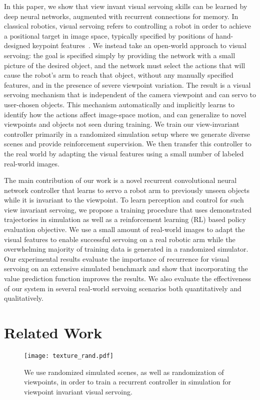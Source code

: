 \documentclass[10pt,twocolumn,letterpaper]{article}
\begin{document}
In this paper, we show that view invant visual servoing skills can be learned by deep neural networks, augmented with recurrent connections for memory. In classical robotics, visual servoing refers to controlling a robot in order to achieve a positional target in image space, typically specified by positions of hand-designed keypoint features~\cite{wilson1996relative,hutchinson1996tutorial}. We instead take an open-world approach to visual servoing: the goal is specified simply by providing the network with a small picture of the desired object, and the network must select the actions that will cause the robot's arm to reach that object, without any manually specified features, and in the presence of severe viewpoint variation. The result is a visual servoing mechanism that is independent of the camera viewpoint and can servo to user-chosen objects. This mechanism automatically and implicitly learns to identify how the actions affect image-space motion, and can generalize to novel viewpoints and objects not seen during training. We train our view-invariant controller primarily in a randomized simulation setup where we generate diverse scenes and provide reinforcement supervision. We then transfer this controller to the real world by adapting the visual features using a small number of labeled real-world images.

The main contribution of our work is a novel recurrent convolutional neural network controller that learns to servo a robot arm to previously unseen objects while it is invariant to the viewpoint. To learn perception and control for such view invariant servoing, we propose a training procedure that uses demonstrated trajectories in simulation as well as a reinforcement learning (RL) based policy evaluation objective. We use a small amount of real-world images to adapt the visual features to enable successful servoing on a real robotic arm while the overwhelming majority of training data is generated in a randomized simulator. Our experimental results evaluate the importance of recurrence for visual servoing on an extensive simulated benchmark and show that incorporating the value prediction function improves the results. We also evaluate the effectiveness of our system in several real-world servoing scenarios both quantitatively and qualitatively.




\section{Related Work}
\begin{figure*}[t]
\begin{center}
\texttt{[image: texture\_rand.pdf]}
\end{center}
\vspace{-.15in}
   \caption{We use randomized simulated scenes, as well as randomization of viewpoints, in order to train a recurrent controller in simulation for viewpoint invariant visual servoing.}
\label{fig:simtxtr}
\vspace{-.15in}
\end{figure*}
\end{document}
